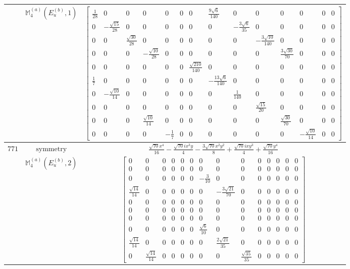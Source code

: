 \documentclass[fleqn,8pt,landscape]{jsarticle}
\begin{document}
\begin{longtable}{ccc}
$  $ & $ \mathbb{M}_{4}^{(a)}(E_{u}^{(b)},1) $ & $ \begin{bmatrix} \frac{1}{28} & 0 & 0 & 0 & 0 & 0 & 0 & \frac{9 \sqrt{6}}{140} & 0 & 0 & 0 & 0 & 0 & 0 \\ 0 & - \frac{\sqrt{15}}{28} & 0 & 0 & 0 & 0 & 0 & 0 & - \frac{3 \sqrt{6}}{35} & 0 & 0 & 0 & 0 & 0 \\ 0 & 0 & \frac{\sqrt{30}}{28} & 0 & 0 & 0 & 0 & 0 & 0 & - \frac{3 \sqrt{10}}{140} & 0 & 0 & 0 & 0 \\ 0 & 0 & 0 & - \frac{\sqrt{10}}{28} & 0 & 0 & 0 & 0 & 0 & 0 & \frac{3 \sqrt{30}}{70} & 0 & 0 & 0 \\ 0 & 0 & 0 & 0 & 0 & 0 & \frac{\sqrt{210}}{140} & 0 & 0 & 0 & 0 & 0 & 0 & 0 \\ \frac{1}{7} & 0 & 0 & 0 & 0 & 0 & 0 & - \frac{13 \sqrt{6}}{140} & 0 & 0 & 0 & 0 & 0 & 0 \\ 0 & - \frac{\sqrt{10}}{14} & 0 & 0 & 0 & 0 & 0 & 0 & \frac{1}{140} & 0 & 0 & 0 & 0 & 0 \\ 0 & 0 & 0 & 0 & 0 & 0 & 0 & 0 & 0 & \frac{\sqrt{15}}{20} & 0 & 0 & 0 & 0 \\ 0 & 0 & 0 & \frac{\sqrt{10}}{14} & 0 & 0 & 0 & 0 & 0 & 0 & \frac{\sqrt{30}}{70} & 0 & 0 & 0 \\ 0 & 0 & 0 & 0 & - \frac{1}{7} & 0 & 0 & 0 & 0 & 0 & 0 & - \frac{\sqrt{10}}{14} & 0 & 0 \end{bmatrix} $ \\ \hline
$ 771 $ & $ \text{symmetry} $ & $ \frac{\sqrt{70} x^{4}}{16} - \frac{\sqrt{70} i x^{3} y}{4} - \frac{3 \sqrt{70} x^{2} y^{2}}{8} + \frac{\sqrt{70} i x y^{3}}{4} + \frac{\sqrt{70} y^{4}}{16} $ \\
$  $ & $ \mathbb{M}_{4}^{(a)}(E_{u}^{(b)},2) $ & $ \begin{bmatrix} 0 & 0 & 0 & 0 & 0 & 0 & 0 & 0 & 0 & 0 & 0 & 0 & 0 & 0 \\ 0 & 0 & 0 & 0 & 0 & 0 & 0 & 0 & 0 & 0 & 0 & 0 & 0 & 0 \\ 0 & 0 & 0 & 0 & 0 & 0 & - \frac{3}{10} & 0 & 0 & 0 & 0 & 0 & 0 & 0 \\ \frac{\sqrt{14}}{14} & 0 & 0 & 0 & 0 & 0 & 0 & - \frac{3 \sqrt{21}}{70} & 0 & 0 & 0 & 0 & 0 & 0 \\ 0 & 0 & 0 & 0 & 0 & 0 & 0 & 0 & 0 & 0 & 0 & 0 & 0 & 0 \\ 0 & 0 & 0 & 0 & 0 & 0 & 0 & 0 & 0 & 0 & 0 & 0 & 0 & 0 \\ 0 & 0 & 0 & 0 & 0 & 0 & 0 & 0 & 0 & 0 & 0 & 0 & 0 & 0 \\ 0 & 0 & 0 & 0 & 0 & 0 & \frac{\sqrt{6}}{10} & 0 & 0 & 0 & 0 & 0 & 0 & 0 \\ \frac{\sqrt{14}}{14} & 0 & 0 & 0 & 0 & 0 & 0 & \frac{2 \sqrt{21}}{35} & 0 & 0 & 0 & 0 & 0 & 0 \\ 0 & \frac{\sqrt{14}}{14} & 0 & 0 & 0 & 0 & 0 & 0 & \frac{\sqrt{35}}{35} & 0 & 0 & 0 & 0 & 0 \end{bmatrix} $ \\ \hline

\end{longtable}
\end{document}
